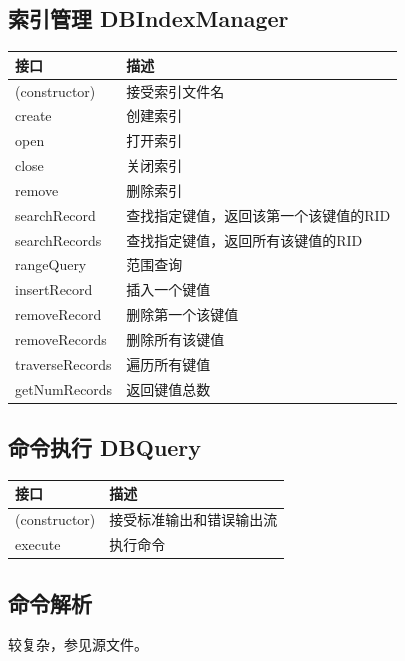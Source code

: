    \subsection{索引管理 DBIndexManager}
        \begin{tabularx}{\textwidth}{lX}
            \toprule
            接口 & 描述 \\
            \midrule
            (constructor) & 接受索引文件名 \\
            \midrule
            create & 创建索引 \\
            \midrule
            open & 打开索引 \\
            \midrule
            close & 关闭索引 \\
            \midrule
            remove & 删除索引 \\
            \midrule 
            searchRecord & 查找指定键值，返回该第一个该键值的RID \\
            \midrule
            searchRecords & 查找指定键值，返回所有该键值的RID \\
            \midrule
            rangeQuery & 范围查询 \\
            \midrule
            insertRecord & 插入一个键值 \\
            \midrule
            removeRecord & 删除第一个该键值 \\
            \midrule
            removeRecords & 删除所有该键值 \\
            \midrule
            traverseRecords & 遍历所有键值 \\
            \midrule
            getNumRecords & 返回键值总数 \\
            \bottomrule
        \end{tabularx}

    \subsection{命令执行 DBQuery}
        \begin{tabularx}{\textwidth}{lX}
            \toprule
            接口 & 描述 \\
            \midrule
            (constructor) & 接受标准输出和错误输出流 \\
            \midrule
            execute & 执行命令 \\
            \bottomrule
        \end{tabularx}

    \subsection{命令解析}
        较复杂，参见源文件。

